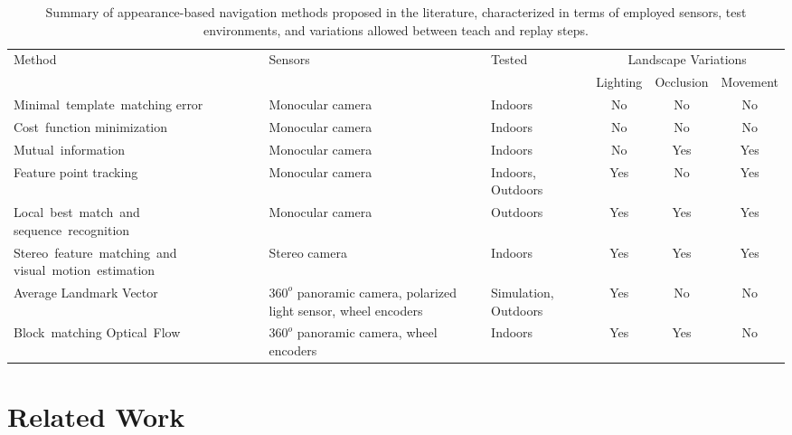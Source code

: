 \documentclass[twocolumn, 9pt,fleqn]{jsproceedings}
\begin{document}
\begin{table}[t]
\centering
\caption{Summary of appearance-based navigation methods proposed in the literature, characterized in terms of employed sensors, test environments, and variations allowed between teach and replay steps.}
\renewcommand{\arraystretch}{1.5}
\setlength{\tabcolsep}{5pt}
\tiny
\begin{tabular}{|m{2.2cm}|m{1.4cm}|m{0.7cm}|c|c|c|}
\hline
    \multirow{2}{*}{\centering Method} & \multirow{2}{*}{Sensors} & \multirow{2}{*}{Tested} & \multicolumn{3}{|c|}{Landscape Variations} \\
\cline{4-6}
    & & & Lighting & Occlusion & Movement \\
\hline
    \mbox{Minimal template matching} \mbox{error~\cite{MAT96}} & Monocular camera & Indoors & No & No & No \\
\hline
    \mbox{Cost function} \mbox{minimization~\cite{OYA96}} & Monocular camera & Indoors & No & No & No \\
\hline
    \mbox{Mutual information~\cite{STE12}} & Monocular camera & Indoors & No & Yes & Yes \\
\hline
    Feature point tracking~\cite{CHE06} & Monocular camera & Indoors, Outdoors & Yes & No & Yes \\
\hline
    \mbox{Local best match and} \mbox{sequence recognition~\cite{MIL12}} & Monocular camera & Outdoors & Yes & Yes & Yes \\
\hline
    \mbox{Stereo feature matching and} \mbox{visual motion estimation~\cite{KIM08}} & Stereo camera & Indoors & Yes & Yes & Yes \\
\hline
    Average Landmark Vector~\cite{LAM00} & $360^o$ panoramic camera, polarized light sensor, wheel encoders & Simulation, Outdoors & Yes & No & No \\
\hline
    \mbox{Block matching} \mbox{Optical Flow~\cite{VAR05}} & $360^o$ panoramic camera, wheel encoders & Indoors & Yes & Yes & No \\
\hline
\end{tabular}
\label{tab:methods}
\end{table}

\section{Related Work}
\end{document}
